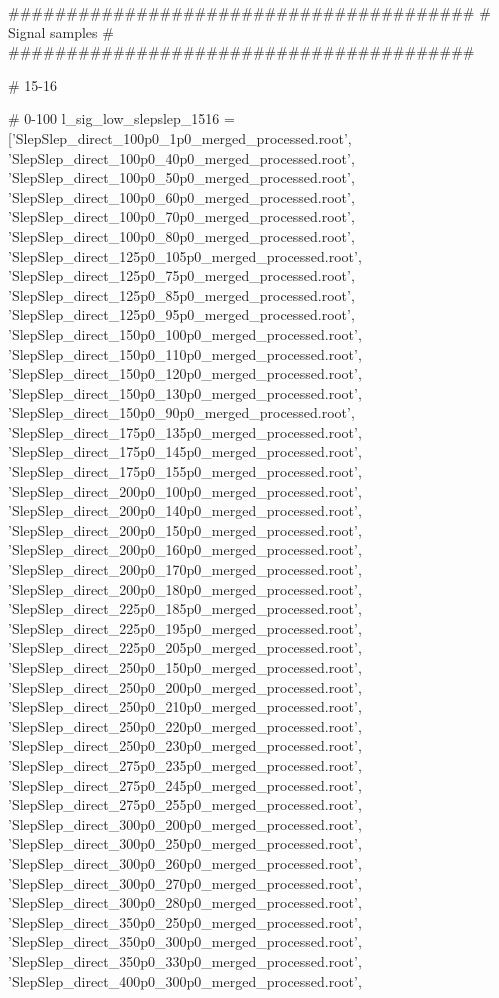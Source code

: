 


########################################
#          Signal samples              #
########################################


# 15-16

# 0-100
l_sig_low_slepslep_1516 = ['SlepSlep_direct_100p0_1p0_merged_processed.root',
'SlepSlep_direct_100p0_40p0_merged_processed.root',
'SlepSlep_direct_100p0_50p0_merged_processed.root',
'SlepSlep_direct_100p0_60p0_merged_processed.root',
'SlepSlep_direct_100p0_70p0_merged_processed.root',
'SlepSlep_direct_100p0_80p0_merged_processed.root',
'SlepSlep_direct_125p0_105p0_merged_processed.root',
'SlepSlep_direct_125p0_75p0_merged_processed.root',
'SlepSlep_direct_125p0_85p0_merged_processed.root',
'SlepSlep_direct_125p0_95p0_merged_processed.root',
'SlepSlep_direct_150p0_100p0_merged_processed.root',
'SlepSlep_direct_150p0_110p0_merged_processed.root',
'SlepSlep_direct_150p0_120p0_merged_processed.root',
'SlepSlep_direct_150p0_130p0_merged_processed.root',
'SlepSlep_direct_150p0_90p0_merged_processed.root',
'SlepSlep_direct_175p0_135p0_merged_processed.root',
'SlepSlep_direct_175p0_145p0_merged_processed.root',
'SlepSlep_direct_175p0_155p0_merged_processed.root',
'SlepSlep_direct_200p0_100p0_merged_processed.root',
'SlepSlep_direct_200p0_140p0_merged_processed.root',
'SlepSlep_direct_200p0_150p0_merged_processed.root',
'SlepSlep_direct_200p0_160p0_merged_processed.root',
'SlepSlep_direct_200p0_170p0_merged_processed.root',
'SlepSlep_direct_200p0_180p0_merged_processed.root',
'SlepSlep_direct_225p0_185p0_merged_processed.root',
'SlepSlep_direct_225p0_195p0_merged_processed.root',
'SlepSlep_direct_225p0_205p0_merged_processed.root',
'SlepSlep_direct_250p0_150p0_merged_processed.root',
'SlepSlep_direct_250p0_200p0_merged_processed.root',
'SlepSlep_direct_250p0_210p0_merged_processed.root',
'SlepSlep_direct_250p0_220p0_merged_processed.root',
'SlepSlep_direct_250p0_230p0_merged_processed.root',
'SlepSlep_direct_275p0_235p0_merged_processed.root',
'SlepSlep_direct_275p0_245p0_merged_processed.root',
'SlepSlep_direct_275p0_255p0_merged_processed.root',
'SlepSlep_direct_300p0_200p0_merged_processed.root',
'SlepSlep_direct_300p0_250p0_merged_processed.root',
'SlepSlep_direct_300p0_260p0_merged_processed.root',
'SlepSlep_direct_300p0_270p0_merged_processed.root',
'SlepSlep_direct_300p0_280p0_merged_processed.root',
'SlepSlep_direct_350p0_250p0_merged_processed.root',
'SlepSlep_direct_350p0_300p0_merged_processed.root',
'SlepSlep_direct_350p0_330p0_merged_processed.root',
'SlepSlep_direct_400p0_300p0_merged_processed.root',
